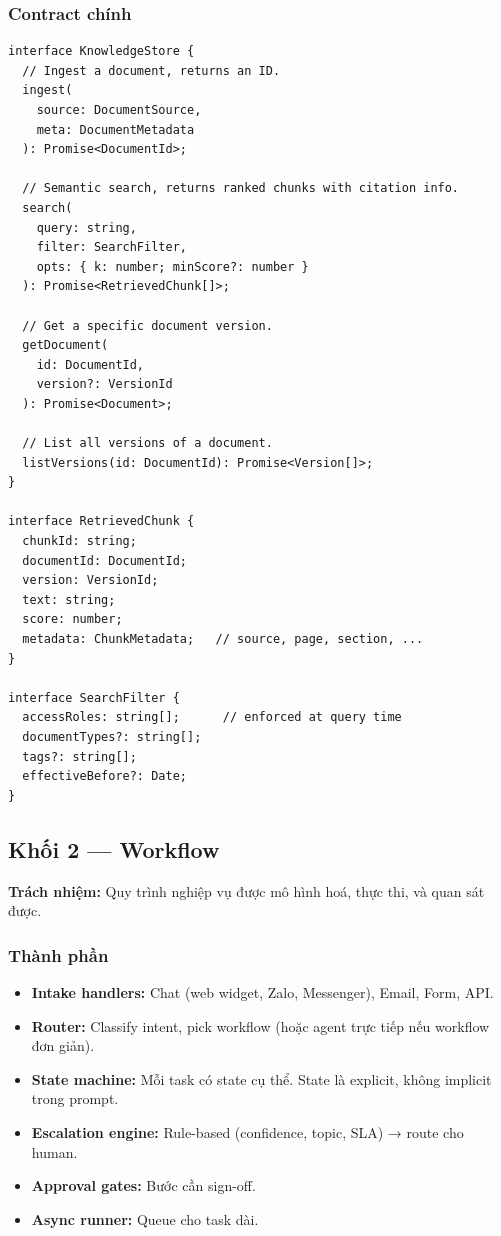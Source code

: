 \documentclass[11pt,a4paper]{article}
\begin{document}
\subsubsection*{Contract chính}

\begin{lstlisting}
interface KnowledgeStore {
  // Ingest a document, returns an ID.
  ingest(
    source: DocumentSource,
    meta: DocumentMetadata
  ): Promise<DocumentId>;

  // Semantic search, returns ranked chunks with citation info.
  search(
    query: string,
    filter: SearchFilter,
    opts: { k: number; minScore?: number }
  ): Promise<RetrievedChunk[]>;

  // Get a specific document version.
  getDocument(
    id: DocumentId,
    version?: VersionId
  ): Promise<Document>;

  // List all versions of a document.
  listVersions(id: DocumentId): Promise<Version[]>;
}

interface RetrievedChunk {
  chunkId: string;
  documentId: DocumentId;
  version: VersionId;
  text: string;
  score: number;
  metadata: ChunkMetadata;   // source, page, section, ...
}

interface SearchFilter {
  accessRoles: string[];      // enforced at query time
  documentTypes?: string[];
  tags?: string[];
  effectiveBefore?: Date;
}
\end{lstlisting}

\subsection{Khối 2 — Workflow}

\textbf{Trách nhiệm:} Quy trình nghiệp vụ được mô hình hoá, thực thi, và quan sát được.

\subsubsection*{Thành phần}
\begin{itemize}
\item \textbf{Intake handlers:} Chat (web widget, Zalo, Messenger), Email, Form, API.
\item \textbf{Router:} Classify intent, pick workflow (hoặc agent trực tiếp nếu workflow đơn giản).
\item \textbf{State machine:} Mỗi task có state cụ thể. State là explicit, không implicit trong prompt.
\item \textbf{Escalation engine:} Rule-based (confidence, topic, SLA) → route cho human.
\item \textbf{Approval gates:} Bước cần sign-off.
\item \textbf{Async runner:} Queue cho task dài.
\end{itemize}
\end{document}
